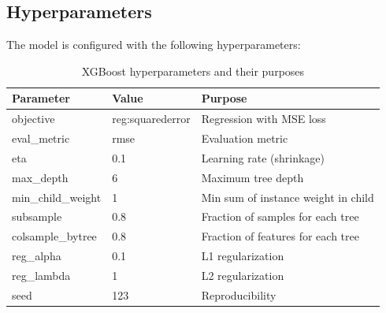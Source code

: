 \documentclass{article}
\begin{document}

\subsection{Hyperparameters}

The model is configured with the following hyperparameters:

\begin{table}[H]
\centering
\begin{tabular}{lll}
\toprule
\textbf{Parameter} & \textbf{Value} & \textbf{Purpose} \\
\midrule
objective & reg:squarederror & Regression with MSE loss \\
eval\_metric & rmse & Evaluation metric \\
eta & 0.1 & Learning rate (shrinkage) \\
max\_depth & 6 & Maximum tree depth \\
min\_child\_weight & 1 & Min sum of instance weight in child \\
subsample & 0.8 & Fraction of samples for each tree \\
colsample\_bytree & 0.8 & Fraction of features for each tree \\
reg\_alpha & 0.1 & L1 regularization \\
reg\_lambda & 1 & L2 regularization \\
seed & 123 & Reproducibility \\
\bottomrule
\end{tabular}
\caption{XGBoost hyperparameters and their purposes}
\label{tab:hyperparameters}
\end{table}
\end{document}
